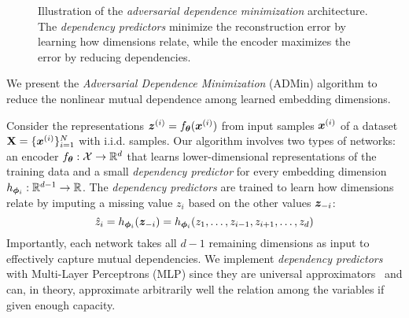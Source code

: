 \begin{figure*} %
    \centering
    \def\svgwidth{0.68\textwidth}
    {\scriptsize }
    \caption{Illustration of the \textit{adversarial dependence minimization} architecture. The \textit{dependency predictors} minimize the reconstruction error by learning how dimensions relate, while the encoder maximizes the error by reducing dependencies.}
    \label{fig:adversarial_game_illustr}
\end{figure*} %
\label{sec:method_description}

We present the \textit{Adversarial Dependence Minimization} (ADMin) algorithm to reduce the nonlinear mutual dependence among learned embedding dimensions. 

Consider the representations ${\bm{z}}^{(i)} = f_{{\bm{\theta}}}({\bm{x}}^{(i)})$ from input samples ${\bm{x}}^{(i)}$ of a dataset ${\mathbf{X}}=\{{\bm{x}}^{(i)}\}_{i=1}^N$ with i.i.d. samples.
Our algorithm involves two types of networks: an encoder $f_{\bm{\theta}}: \mathcal{X} \to \mathbb{R}^d$ that learns lower-dimensional representations of the training data and a small \textit{dependency predictor} for every embedding dimension $h_{{\bm{\phi}}_i}: \mathbb{R}^{d-1} \to \mathbb{R}$.  %
The \textit{dependency predictors} are trained to learn how dimensions relate by imputing a missing value $z_i$ based on the other values ${\bm{z}}_{-i}$: 
\begin{equation} \label{eq:min_mse_reco}
    \hat{z}_i = h_{{\bm{\phi}}_i}({\bm{z}}_{-i}) = h_{{\bm{\phi}}_i}(z_1, \dots, z_{i-1}, z_{i+1}, \dots, z_d)
\end{equation}
Importantly, each network takes all $d-1$ remaining dimensions as input to effectively capture mutual dependencies. 
We implement \textit{dependency predictors} with Multi-Layer Perceptrons (MLP) since they are universal approximators~\citep{hornik_mlp_universal,cybenko1989universal_approx_orig, leshno1993universal_approx_nonpolyn} and can, in theory, approximate arbitrarily well the relation among the variables if given enough capacity. 

